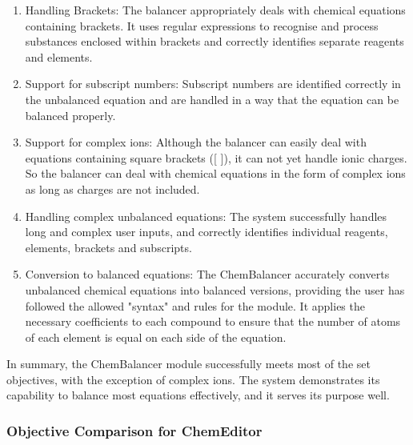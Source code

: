 \documentclass[a4paper,12pt]{article}
\begin{document}
\begin{enumerate}

\item Handling Brackets: The balancer appropriately deals with chemical equations containing brackets. It uses regular expressions to recognise and process substances enclosed within brackets and correctly identifies separate reagents and elements.

\item Support for subscript numbers: Subscript numbers are identified correctly in the unbalanced equation and are handled in a way that the equation can be balanced properly.

\item Support for complex ions: Although the balancer can easily deal with equations containing square brackets ([ ]), it can not yet handle ionic charges. So the balancer can deal with chemical equations in the form of complex ions as long as charges are not included.

\item Handling complex unbalanced equations: The system successfully handles long and complex user inputs, and correctly identifies individual reagents, elements, brackets and subscripts.

\item Conversion to balanced equations: The ChemBalancer accurately converts unbalanced chemical equations into balanced versions, providing the user has followed the allowed "syntax" and rules for the module. It applies the necessary coefficients to each compound to ensure that the number of atoms of each element is equal on each side of the equation.

\end{enumerate}

In summary, the ChemBalancer module successfully meets most of the set objectives, with the exception of complex ions. The system demonstrates its capability to balance most equations effectively, and it serves its purpose well.

\subsubsection{Objective Comparison for ChemEditor}
\end{document}
